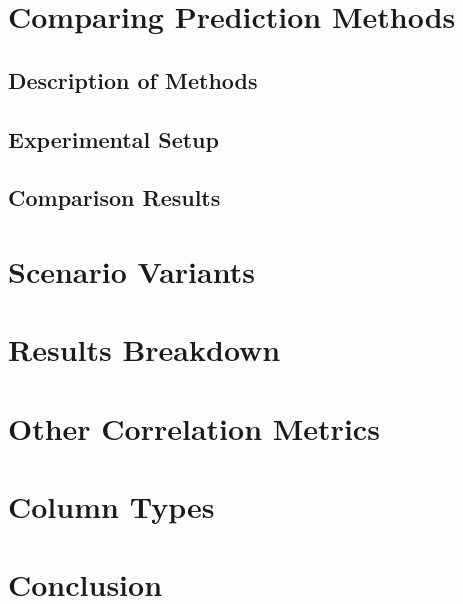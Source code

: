 \documentclass[
  authoryear,
  preprint]{elsarticle}
\begin{document}
\section{Comparing Prediction
Methods}\label{comparing-prediction-methods}

\subsection{Description of Methods}\label{description-of-methods}

\subsection{Experimental Setup}\label{experimental-setup}

\subsection{Comparison Results}\label{comparison-results}

\section{Scenario Variants}\label{scenario-variants}

\section{Results Breakdown}\label{results-breakdown}

\section{Other Correlation Metrics}\label{other-correlation-metrics}

\section{Column Types}\label{column-types}

\section{Conclusion}\label{conclusion}


\renewcommand\refname{References}
  
\end{document}
